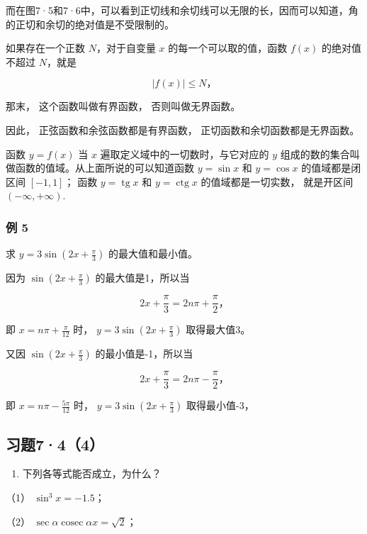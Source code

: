 而在图7·5和7·6中，可以看到正切线和余切线可以无限的长，因而可以知道，角的正切和余切的绝对值是不受限制的。

如果存在一个正数 \(N\)，对于自变量 \(x\) 的每一个可以取的值，函数
\(f(x)\) 的绝对值不超过 \(N\)，就是

\[
\left| f (x) \right| \leqslant N\text{，}
\]

那末， 这个函数叫做有界函数， 否则叫做无界函数。

因此， 正弦函数和余弦函数都是有界函数， 正切函数和余切函数都是无界函数。

函数 \(y = f(x)\) 当 \(x\) 遍取定义域中的一切数时，与它对应的 \(y\)
组成的数的集合叫做函数的值域。从上面所说的可以知道函数 \(y = \sin x\) 和
\(y = \cos x\) 的值域都是闭区间 \([-1, 1]\)； 函数
\(y = \operatorname{tg} x\) 和 \(y = \operatorname{ctg} x\)
的值域都是一切实数， 就是开区间 \((- \infty, + \infty)\).

\subsubsection{例 5}

求 \(y = 3\sin \left(2x + \frac{\pi}{3}\right)\) 的最大值和最小值。

 因为 \(\sin \left(2x + \frac{\pi}{3}\right)\)
的最大值是1，所以当

\[
2 x + \frac {\pi}{3} = 2 n \pi + \frac {\pi}{2}\text{，}
\]

即 \(x = n\pi + \frac{\pi}{12}\) 时，
\(y=3\sin\left(2x+\frac{\pi}{3}\right)\) 取得最大值3。

又因 \(\sin \left(2x + \frac{\pi}{3}\right)\) 的最小值是-1，所以当

\[
2 x + \frac {\pi}{3} = 2 n \pi - \frac {\pi}{2}\text{，}
\]

即 \(x = n\pi -\frac{5\pi}{12}\) 时，
\(y=3\sin\left(2x+\frac{\pi}{3}\right)\) 取得最小值-3，

\subsection{习题7·4（4）}

\begin{enumerate}
\item
  下列各等式能否成立，为什么？
\end{enumerate}

（1） \(\sin^3 x = -1.5\)；

（2） \(\sec \alpha \operatorname{cosec} \alpha x = \sqrt{2}\)；

